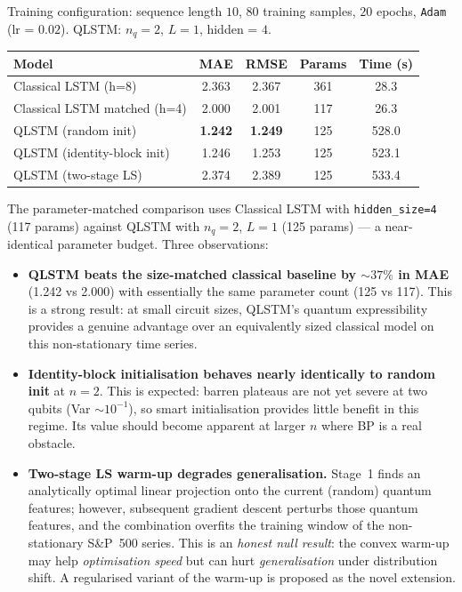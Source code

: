 \documentclass[10pt,twocolumn]{article}
\begin{document}
Training configuration: sequence length $10$, $80$ training samples, $20$ epochs, \texttt{Adam} (lr = $0.02$). QLSTM: $n_q{=}2$, $L{=}1$, hidden = $4$.

\begin{center}
\begin{tabular}{@{}lcccc@{}}
\toprule
\textbf{Model} & \textbf{MAE} & \textbf{RMSE} & \textbf{Params} & \textbf{Time (s)} \\
\midrule
Classical LSTM (h=8)             & 2.363 & 2.367 & 361 & 28.3 \\
Classical LSTM matched (h=4)     & 2.000 & 2.001 & 117 & 26.3 \\
QLSTM (random init)              & \textbf{1.242} & \textbf{1.249} & 125 & 528.0 \\
QLSTM (identity-block init)      & 1.246 & 1.253 & 125 & 523.1 \\
QLSTM (two-stage LS)             & 2.374 & 2.389 & 125 & 533.4 \\
\bottomrule
\end{tabular}
\end{center}

The parameter-matched comparison uses Classical LSTM with \texttt{hidden\_size=4} (117 params) against QLSTM with $n_q{=}2$, $L{=}1$ (125 params) — a near-identical parameter budget. Three observations:

\begin{itemize}
  \item \textbf{QLSTM beats the size-matched classical baseline by ${\sim}37\%$ in MAE} (1.242 vs 2.000) with essentially the same parameter count (125 vs 117). This is a strong result: at small circuit sizes, QLSTM's quantum expressibility provides a genuine advantage over an equivalently sized classical model on this non-stationary time series.
  \item \textbf{Identity-block initialisation behaves nearly identically to random init} at $n{=}2$. This is expected: barren plateaus are not yet severe at two qubits (Var $\sim 10^{-1}$), so smart initialisation provides little benefit in this regime. Its value should become apparent at larger $n$ where BP is a real obstacle.
  \item \textbf{Two-stage LS warm-up degrades generalisation.} Stage~1 finds an analytically optimal linear projection onto the current (random) quantum features; however, subsequent gradient descent perturbs those quantum features, and the combination overfits the training window of the non-stationary S\&P~500 series. This is an \emph{honest null result}: the convex warm-up may help \emph{optimisation speed} but can hurt \emph{generalisation} under distribution shift. A regularised variant of the warm-up is proposed as the novel extension.
\end{itemize}
\end{document}
